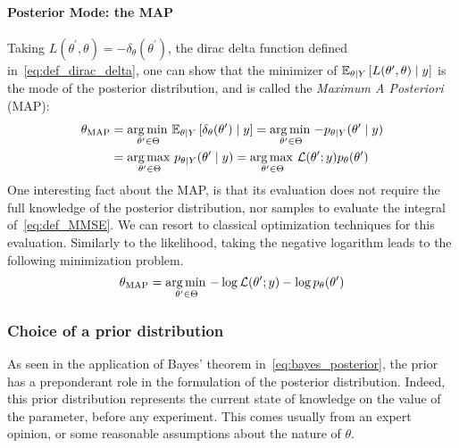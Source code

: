 \documentclass[../../Main_ManuscritThese.tex]{subfiles}
\begin{document}
\paragraph{Posterior Mode: the MAP}
Taking $L(\theta^{\prime},\theta) = -\delta_{\theta}(\theta^{\prime})$, the dirac delta function defined in~\cref{eq:def_dirac_delta}, one can show that the minimizer of $\mathbb{E}_{\theta\mid Y}\left[L(\theta^{\prime},\theta) \mid y\right]$ is the mode of the posterior distribution, and is called the \emph{Maximum A Posteriori} (MAP):
\begin{align}
  \label{eq:def_MAP}
  {\theta}_{\mathrm{MAP}} &= \operatorname*{arg\,min \,}_{\theta^{\prime} \in \Theta}\mathbb{E}_{\theta\mid Y}\left[\delta_{\theta}(\theta^{\prime})\mid y\right] = \operatorname*{arg\,min \,}_{\theta^{\prime} \in \Theta} -p_{\theta\mid Y}(\theta^{\prime}\mid y) \\
                         &= \operatorname*{arg\,max \,}_{\theta^{\prime} \in \Theta} p_{\theta\mid Y}(\theta^{\prime} \mid y) = \operatorname*{arg\,max \,}_{\theta^{\prime} \in \Theta} \mathcal{L}(\theta^{\prime} ;y)p_{\theta}(\theta^{\prime})
                           \nonumber
\end{align}
One interesting fact about the MAP, is that its evaluation does not require the full knowledge of the posterior distribution, nor samples to evaluate the integral of~\cref{eq:def_MMSE}. We can resort to classical optimization techniques for this evaluation. Similarly to the likelihood, taking the negative logarithm leads to the following minimization problem.
\begin{equation}
  \label{eq:minimisation_MAP_log}
  {\theta}_{\mathrm{MAP}} = \operatorname*{arg\,min \,}_{\theta^{\prime}\in \Theta} -\log \mathcal{L}(\theta^{\prime};y) - \log p_{\theta}(\theta^{\prime})
\end{equation}

\subsubsection{Choice of a prior distribution}
\label{sec:choice_prior}
As seen in the application of Bayes' theorem in~\cref{eq:bayes_posterior}, the prior has a preponderant role in the formulation of the posterior distribution. Indeed, this prior distribution represents the current state of knowledge on the value of the parameter, before any experiment. This comes usually from an expert opinion, or some reasonable assumptions about the nature of $\theta$.
\end{document}
